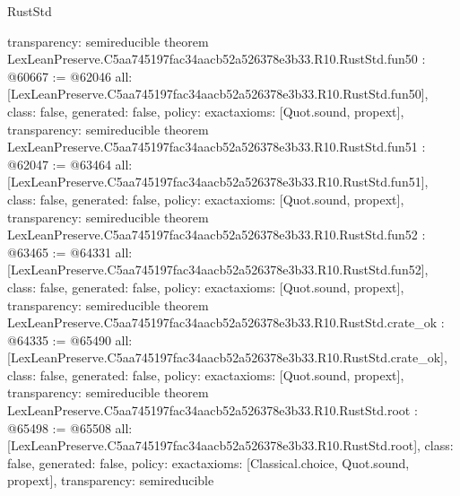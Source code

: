\begin{lexlean}{RustStd}
\begin{coremodule}
{  transparency: semireducible
}
theorem LexLeanPreserve.C5aa745197fac34aacb52a526378e3b33.R10.RustStd.fun50 : @60667 := @62046 {
  all: [LexLeanPreserve.C5aa745197fac34aacb52a526378e3b33.R10.RustStd.fun50],
  class: false,
  generated: false,
  policy: exact{axioms: [Quot.sound, propext]},
  transparency: semireducible
}
theorem LexLeanPreserve.C5aa745197fac34aacb52a526378e3b33.R10.RustStd.fun51 : @62047 := @63464 {
  all: [LexLeanPreserve.C5aa745197fac34aacb52a526378e3b33.R10.RustStd.fun51],
  class: false,
  generated: false,
  policy: exact{axioms: [Quot.sound, propext]},
  transparency: semireducible
}
theorem LexLeanPreserve.C5aa745197fac34aacb52a526378e3b33.R10.RustStd.fun52 : @63465 := @64331 {
  all: [LexLeanPreserve.C5aa745197fac34aacb52a526378e3b33.R10.RustStd.fun52],
  class: false,
  generated: false,
  policy: exact{axioms: [Quot.sound, propext]},
  transparency: semireducible
}
theorem LexLeanPreserve.C5aa745197fac34aacb52a526378e3b33.R10.RustStd.crate_ok : @64335 := @65490 {
  all: [LexLeanPreserve.C5aa745197fac34aacb52a526378e3b33.R10.RustStd.crate_ok],
  class: false,
  generated: false,
  policy: exact{axioms: [Quot.sound, propext]},
  transparency: semireducible
}
theorem LexLeanPreserve.C5aa745197fac34aacb52a526378e3b33.R10.RustStd.root : @65498 := @65508 {
  all: [LexLeanPreserve.C5aa745197fac34aacb52a526378e3b33.R10.RustStd.root],
  class: false,
  generated: false,
  policy: exact{axioms: [Classical.choice, Quot.sound, propext]},
  transparency: semireducible
}


\end{coremodule}
\end{lexlean}
